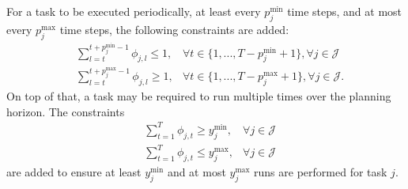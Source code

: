 For a task to be executed periodically, at least every $p_j^{\text{min}}$ time steps, and at most every $p_j^{\text{max}}$ time steps, the following constraints are added:
\begin{equation}\label{eq:prediodicity-constraints}
    \begin{aligned}
        &\sum_{l=t}^{t+{p}^{\min}_{j}-1} \phi_{j,l} \leq 1,   & \forall t \in \{1,...,T-{p}^{\min}_{j}+1\}, \forall j\in\mathcal{J}  \\
        & \sum_{l=t}^{t+{p}^{\max}_{j}-1} \phi_{j,l} \geq 1,  & \forall t \in \{1,...,T-{p}^{\max}_{j}+1\},  \forall j\in\mathcal{J} 
    .\end{aligned}
\end{equation}
On top of that, a task may be required to run multiple times over the planning horizon.
The constraints
\begin{equation}\label{eq:multiple-execs-constraints}
    \begin{aligned}
        &\sum_{t=1}^{T} \phi_{j,t} \geq {y}^{\min}_{j}, &\forall j\in\mathcal{J}   \\
        &\sum_{t=1}^{T} \phi_{j,t} \leq {y}^{\max}_{j}, &\forall j\in\mathcal{J}
    \end{aligned}
\end{equation}
are added to ensure at least $y_{j}^{\text{min}}$ and at most $y_j^{\text{max}}$ runs are performed for task $j$.

